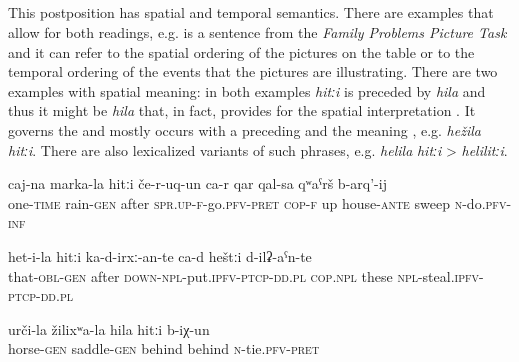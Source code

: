 
\subsection{ }
\label{ssec:postposition hiti}

This postposition has spatial and temporal semantics. There are examples that allow for both readings, e.g.  is a sentence from the \textit{Family Problems Picture Task} \citep{SanRoqueEtAl2012} and it can refer to the spatial ordering of the pictures on the table or to the temporal ordering of the events that the pictures are illustrating. There are two examples with spatial meaning: in both examples \textit{hitːi} is preceded by \textit{hila} and thus it might be \textit{hila} that, in fact, provides for the spatial interpretation . It governs the  and mostly occurs with a preceding  and the meaning , e.g. \textit{hežila} \textit{hitːi}. There are also lexicalized variants of such phrases, e.g. \textit{helila} \textit{hitːi} > \textit{helilitːi}.

\begin{exe}
	\ex
	\begin{xlist}
		\ex	\label{Once after the rain (she) went up to sweep in front of the house}
		\gll	caj-na	marka-la	hitːi	če-r-uq-un ca-r	qar	qal-sa	qʷaˁrš	b-arq'-ij  \\
			one-\textsc{time}	rain-\textsc{gen}	after	\textsc{spr.up}-\textsc{f}-go.\textsc{pfv}-\textsc{pret} \textsc{cop-f}	up	house-\textsc{ante}	sweep	\textsc{n}-do.\textsc{pfv}-\textsc{inf}\\
		\glt	{}

		\ex	\label{After this (one) must put these, these where they steal}
		\gll	het-i-la	hitːi	ka-d-irxː-an-te ca-d	heštːi	d-ilʡ-aˁn-te \\
			that-\textsc{obl}-\textsc{gen}	after	\textsc{down-npl}-put.\textsc{ipfv}-\textsc{ptcp}-\textsc{dd}.\textsc{pl} \textsc{cop.npl}	these	\textsc{npl}-steal.\textsc{ipfv}-\textsc{ptcp}-\textsc{dd}.\textsc{pl}\\
		\glt	{}

		\ex	\label{He tied it behind the saddle}
		\gll	urči-la	žilixʷa-la	hila	hitːi	b-iχ-un  \\
			horse-\textsc{gen}	saddle-\textsc{gen}	behind	behind	\textsc{n}-tie.\textsc{pfv}-\textsc{pret}\\
		\glt	{}
	\end{xlist}
\end{exe}

